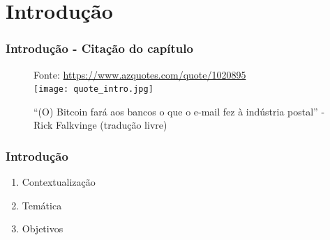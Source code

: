 \documentclass[aspectratio=43,8pt]{beamer}%
\begin{document}

\section{Introdução}

\begin{frame}
	\frametitle{Introdução - Citação do capítulo}
	
		\begin{figure}
		\centering
		{\footnotesize Fonte:  \url{https://www.azquotes.com/quote/1020895}}\\
		\texttt{[image: quote\_intro.jpg]}
		\caption{``(O) Bitcoin fará aos bancos o que o e-mail
			fez à indústria postal'' - Rick Falkvinge
			(tradução livre)}
		\end{figure}
\end{frame}

\begin{frame}
	\frametitle{Introdução}
	
	\begin{keypoint}
	
	\begin{enumerate}
		\item Contextualização
 \pause
		
		\item Temática 
\pause
		
		\item Objetivos 
	\end{enumerate}
	\end{keypoint}
		\end{frame}
	
\end{document}
